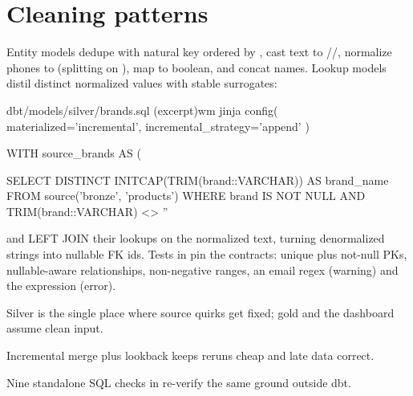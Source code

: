 \section{Cleaning patterns}

Entity models dedupe with  natural key ordered by , cast text to //, normalize phones to  (splitting  on ), map  to boolean, and concat names. Lookup models distil distinct normalized values with stable surrogates:

\begin{wmlisting}{dbt/models/silver/brands.sql (excerpt)}{wm jinja}
{{ config(
    materialized='incremental',
    incremental_strategy='append'
) }}

WITH source_brands AS (

    SELECT DISTINCT INITCAP(TRIM(brand::VARCHAR)) AS brand_name
    FROM {{ source('bronze', 'products') }}
    WHERE
        brand IS NOT NULL
        AND TRIM(brand::VARCHAR) <> ''
\end{wmlisting}

 and  LEFT JOIN their lookups on the normalized text, turning denormalized strings into nullable FK ids. Tests in  pin the contracts: unique plus not-null PKs, nullable-aware relationships, non-negative ranges, an email regex (warning) and the  expression (error).

\begin{keybox}
\item Silver is the single place where source quirks get fixed; gold and the dashboard assume clean input.
\item Incremental merge plus lookback keeps reruns cheap and late data correct.
\item Nine standalone SQL checks in  re-verify the same ground outside dbt.
\end{keybox}
